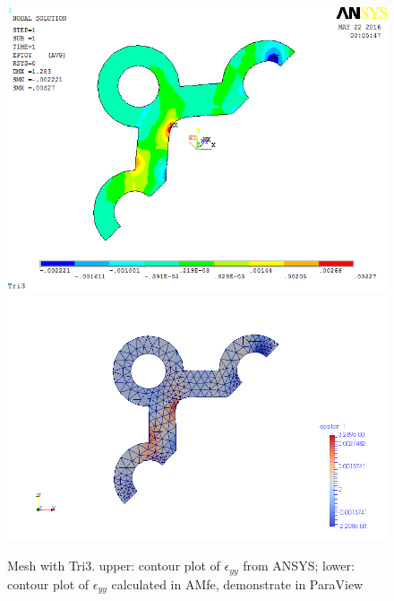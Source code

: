 \begin{figure}[htbp]
	\begin{center}
		\includegraphics[width=13cm,clip]{TTri3_Eyy.png} 		
		\includegraphics[width=13cm,clip]{TTri3_Eyy_P.png} 		
		\caption{Mesh with Tri3. upper: contour plot of $\epsilon_{yy}$ from ANSYS; lower: contour plot of $\epsilon_{yy}$ calculated in AMfe, demonstrate in ParaView} \label{fig: Tri3_Eyy}
	\end{center}
\end{figure}
\clearpage 

